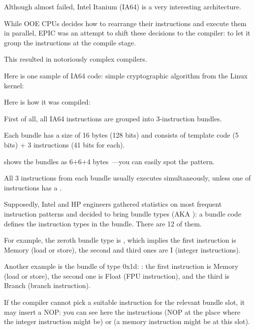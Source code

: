 \label{itanium}

Although almost failed, Intel Itanium (\ac{IA64}) is a very interesting architecture.

While \ac{OOE} CPUs decides how to rearrange their instructions and execute them in parallel,
\ac{EPIC} was an attempt to shift these decisions to the compiler:
to let it group the instructions at the compile stage.

This resulted in notoriously complex compilers.

Here is one sample of \ac{IA64} code: simple cryptographic algorithm from the Linux kernel:



Here is how it was compiled:



First of all, all \ac{IA64} instructions are grouped into 3-instruction bundles.

Each bundle has a size of 16 bytes (128 bits) and consists of template code (5 bits) + 3 instructions (41 bits for each).

\IDA shows the bundles as 6+6+4 bytes~---you can easily spot the pattern.

All 3 instructions from each bundle usually executes simultaneously, unless one of instructions has a .

Supposedly, Intel and HP engineers gathered statistics on most frequent instruction patterns and decided to bring
bundle types (\ac{AKA} ): a bundle code defines the instruction types in the bundle.
There are 12 of them.

For example, the zeroth bundle type is , which implies 
the first instruction is Memory (load or store), the second and third ones are I (integer instructions).

Another example is the bundle of type 0x1d: :
the first instruction is Memory (load or store), the second one is Float 
(\ac{FPU} instruction), and the third is Branch (branch instruction).

If the compiler cannot pick a suitable instruction for the relevant bundle slot, it may insert a \ac{NOP}:
you can see here the
 instructions (\ac{NOP} at the place where the integer instruction might be) or  
(a memory instruction might be at this slot).

